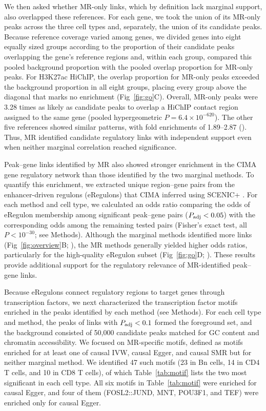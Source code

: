 \noindent We then asked whether MR-only links, which by definition lack marginal support, also overlapped these references. For each gene, we took the union of its MR-only peaks across the three cell types and, separately, the union of its candidate peaks. Because reference coverage varied among genes, we divided genes into eight equally sized groups according to the proportion of their candidate peaks overlapping the gene's reference regions and, within each group, compared this pooled background proportion with the pooled overlap proportion for MR-only peaks. For H3K27ac HiChIP, the overlap proportion for MR-only peaks exceeded the background proportion in all eight groups, placing every group above the diagonal that marks no enrichment (Fig~\ref{fig:go}C). Overall, MR-only peaks were 3.28 times as likely as candidate peaks to overlap a HiChIP contact region assigned to the same gene (pooled hypergeometric \(P=6.4\times10^{-620}\)). The other five references showed similar patterns, with fold enrichments of 1.89--2.87 (). Thus, MR identified candidate regulatory links with independent support even when neither marginal correlation reached significance.

\noindent Peak--gene links identified by MR also showed stronger enrichment in the CIMA gene regulatory network than those identified by the two marginal methods. To quantify this enrichment, we extracted unique region--gene pairs from the enhancer-driven regulons (eRegulons) that CIMA inferred using SCENIC+ \cite{yin2026cima}. For each method and cell type, we calculated an odds ratio comparing the odds of eRegulon membership among significant peak--gene pairs (\(P_{\mathrm{adj}}<0.05\)) with the corresponding odds among the remaining tested pairs (Fisher's exact test, all \(P<10^{-30}\); see Methods). Although the marginal methods identified more links (Fig~\ref{fig:overview}B; ), the MR methods generally yielded higher odds ratios, particularly for the high-quality eRegulon subset (Fig~\ref{fig:go}D; ). These results provide additional support for the regulatory relevance of MR-identified peak--gene links.

\noindent Because eRegulons connect regulatory regions to target genes through transcription factors, we next characterized the transcription factor motifs enriched in the peaks identified by each method (see Methods). For each cell type and method, the peaks of links with \(P_{\mathrm{adj}}<0.1\) formed the foreground set, and the background consisted of 50,000 candidate peaks matched for GC content and chromatin accessibility. We focused on MR-specific motifs, defined as motifs enriched for at least one of causal IVW, causal Egger, and causal SMR but for neither marginal method. We identified 47 such motifs (23 in Bn cells, 14 in CD4 T cells, and 10 in CD8 T cells), of which Table~\ref{tab:motif} lists the two most significant in each cell type. All six motifs in Table~\ref{tab:motif} were enriched for causal Egger, and four of them (FOSL2::JUND, MNT, POU3F1, and TEF) were enriched only for causal Egger.

